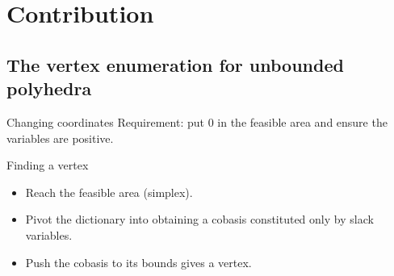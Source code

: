 \section{Contribution}
\subsection{The vertex enumeration for unbounded polyhedra}
\begin{frame}{Changing coordinates}
Requirement: put $0$ in the feasible area and ensure the variables are positive.

\vspace*{0.5cm}

\begin{block}{Finding a vertex}
\begin{itemize}
\item Reach the feasible area (simplex).
\item Pivot the dictionary into obtaining a cobasis constituted only by slack variables.
\item Push the cobasis to its bounds gives a vertex.
\end{itemize}
\end{block}

\end{frame}


